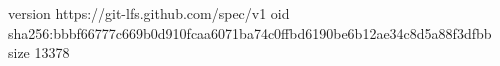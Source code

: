 version https://git-lfs.github.com/spec/v1
oid sha256:bbbf66777c669b0d910fcaa6071ba74c0ffbd6190be6b12ae34c8d5a88f3dfbb
size 13378

